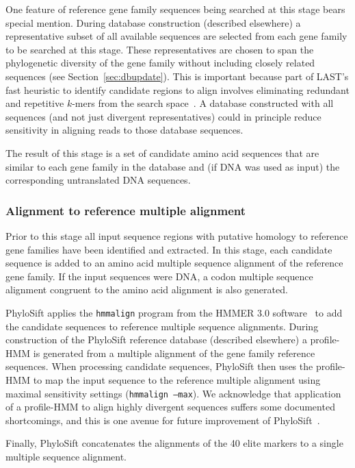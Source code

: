 \documentclass[10pt]{article}
\begin{document}
One feature of reference gene family sequences being searched at this stage bears special mention.
During database construction (described elsewhere) a representative subset of all available sequences are selected from each gene family to be searched at this stage.
These representatives are chosen to span the phylogenetic diversity of the gene family without including closely related sequences (see Section~\ref{sec:dbupdate}).
This is important because part of LAST's fast heuristic to identify candidate regions to align involves eliminating redundant and repetitive $k$-mers from the search space~\cite{Kiełbasa2011}.
A database constructed with all sequences (and not just divergent representatives) could in principle reduce sensitivity in aligning reads to those database sequences.

The result of this stage is a set of candidate amino acid sequences that are similar to each gene family in the database and (if DNA was used as input) the corresponding untranslated DNA sequences.

\subsubsection*{Alignment to reference multiple alignment}
Prior to this stage all input sequence regions with putative homology to reference gene families have been identified and extracted.
In this stage, each candidate sequence is added to an amino acid multiple sequence alignment of the reference gene family.
If the input sequences were {DNA}, a codon multiple sequence alignment congruent to the amino acid alignment is also generated.

PhyloSift applies the \texttt{hmmalign} program from the HMMER 3.0 software~\cite{Eddy2011} to add the candidate sequences to reference multiple sequence alignments.
During construction of the PhyloSift reference database (described elsewhere) a profile-HMM is generated from a multiple alignment of the gene family reference sequences.
When processing candidate sequences, PhyloSift then uses the profile-HMM to map the input sequence to the reference multiple alignment using maximal sensitivity settings (\texttt{hmmalign --max}).
We acknowledge that application of a profile-HMM to align highly divergent sequences suffers some documented shortcomings, and this is one avenue for future improvement of PhyloSift~\cite{Loytynoja2012}.

Finally, PhyloSift concatenates the alignments of the 40 elite markers to a single multiple sequence alignment.
\end{document}
